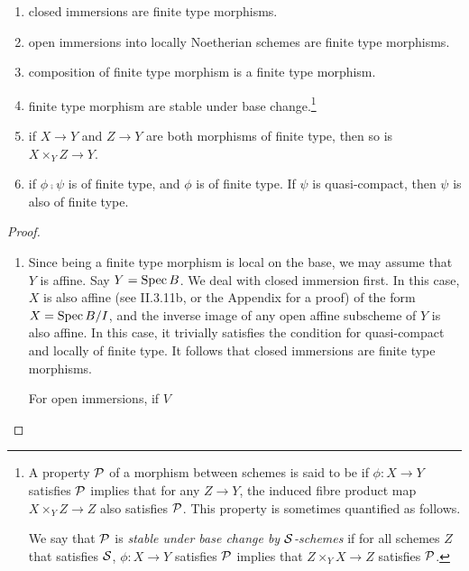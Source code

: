 \begin{cor}
\begin{enumerate}
\item closed immersions are finite type morphisms. 

\item open immersions into locally Noetherian schemes are finite 
type morphisms.

\item composition of finite type morphism is a finite type 
morphism.

\item finite type morphism are stable under base change.\footnote{
A property $\mathcal{P}$ of a morphism between schemes is said to 
be  if 
$\phi: X \to Y$ satisfies $\mathcal{P}$ implies that for any $Z 
\to Y$, the induced fibre product map $X \times_Y Z \to Z$ also 
satisfies $\mathcal{P}$. This property is sometimes quantified as 
follows.

We say that $\mathcal{P}$ is \emph{stable under base change by 
$\mathcal{S}$-schemes} if for all schemes $Z$ that satisfies 
$\mathcal{S}$, $\phi : X \to Y$ satisfies $\mathcal{P}$ implies 
that $Z \times_Y X \to Z$ satisfies $\mathcal{P}$.}

\item if $X \to Y$ and $Z \to Y$ are both morphisms of finite
type, then so is $X \times_Y Z \to Y$.

\item if $\phi \comp \psi$ is of finite type, and $\phi$ is of
finite type. If $\psi$ is quasi-compact, then $\psi$ is also
of finite type.
\end{enumerate}
\end{cor}

\begin{proof}
\begin{enumerate}
\item Since being a finite type morphism is local on the base,
we may assume that $Y$ is affine. Say $Y = \mathrm{Spec}\, B$. We deal with 
closed immersion first. In this case, $X$ is also affine (see 
\cite{Hart} II.3.11b, or the Appendix for a proof) of the form $X 
= \mathrm{Spec}\, B/I$, and the inverse image of any open affine subscheme of 
$Y$ is also affine. In this case, it trivially satisfies the
condition for quasi-compact and locally of finite type. It follows
that closed immersions are finite type morphisms.

For open immersions, if $V$

\end{enumerate}
\end{proof}

